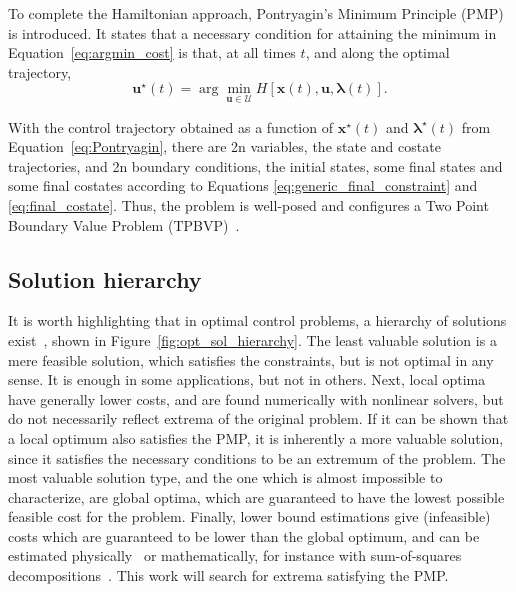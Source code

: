 To complete the Hamiltonian approach, Pontryagin's Minimum Principle (PMP) is introduced. It states that a necessary condition for attaining the minimum in Equation~\eqref{eq:argmin_cost} is that, at all times \(t\), and along the optimal trajectory,~\cite{bertsekas}
\begin{equation} \label{eq:Pontryagin}
    \mathbf{u}^\star(t) = \arg \min_{\mathbf{u} \in \mathcal{U}} H[\mathbf{x}(t), \mathbf{u}, \boldsymbol{\lambda}(t)].
\end{equation}

With the control trajectory obtained as a function of \(\mathbf{x}^\star(t)\) and \(\boldsymbol{\lambda}^\star(t)\) from Equation~\eqref{eq:Pontryagin}, there are 2n variables, the state and costate trajectories, and 2n boundary conditions, the initial states, some final states and some final costates according to Equations \eqref{eq:generic_final_constraint} and \eqref{eq:final_costate}. Thus, the problem is well-posed and configures a Two Point Boundary Value Problem (TPBVP)~\cite{bryson_applied_optimal_control}.

\subsection{Solution hierarchy}

It is worth highlighting that in optimal control problems, a hierarchy of solutions exist~\cite{ross2015primer}, shown in Figure~\ref{fig:opt_sol_hierarchy}. The least valuable solution is a mere feasible solution, which satisfies the constraints, but is not optimal in any sense. It is enough in some applications, but not in others. Next, local optima have generally lower costs, and are found numerically with nonlinear solvers, but do not necessarily reflect extrema of the original problem. If it can be shown that a local optimum also satisfies the PMP, it is inherently a more valuable solution, since it satisfies the necessary conditions to be an extremum of the problem. The most valuable solution type, and the one which is almost impossible to characterize, are global optima, which are guaranteed to have the lowest possible feasible cost for the problem. Finally, lower bound estimations give (infeasible) costs which are guaranteed to be lower than the global optimum, and can be estimated physically~\cite{impulsive_europa} or mathematically, for instance with sum-of-squares decompositions~\cite{sos_book}. This work will search for extrema satisfying the PMP.

